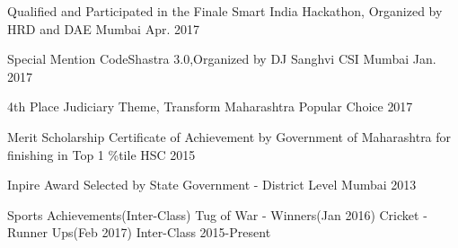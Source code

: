 



\begin{cvhonors}

  \cvhonor
    {Qualified and Participated in the Finale} %
    {Smart India Hackathon, Organized by HRD and DAE} %
    {Mumbai} %
    {Apr. 2017} %

  \cvhonor
    {Special Mention} %
    {CodeShastra 3.0,Organized by DJ Sanghvi CSI} %
    {Mumbai} %
    {Jan. 2017} %

  \cvhonor
    {4th Place} %
    {Judiciary Theme, Transform Maharashtra} %
    {Popular Choice} %
    {2017} %

  \cvhonor
    {Merit Scholarship} %
    {Certificate of Achievement by Government of Maharashtra for finishing in Top 1 \%tile} %
    {HSC} %
    {2015} %

  \cvhonor
    {Inpire Award} %
    {Selected by State Government - District Level} %
    {Mumbai} %
    {2013} %

  \cvhonor
    {Sports Achievements(Inter-Class)} %
    {Tug of War - Winners(Jan 2016)  Cricket - Runner Ups(Feb 2017)} %
    {Inter-Class} %
    {2015-Present} %
\end{cvhonors}




